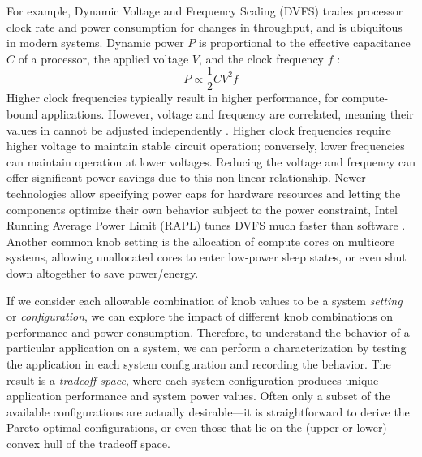 For example, Dynamic Voltage and Frequency Scaling (DVFS) trades processor clock rate and power consumption for changes in throughput, and is ubiquitous in modern systems.
Dynamic power $P$ is proportional to the effective capacitance $C$ of a processor, the applied voltage $V$, and the clock frequency $f$ \cite{Hennessy:2003:CAQ:861856}:
\begin{equation}
P \propto \frac{1}{2}CV^2f
\label{eqn:bg-power}
\end{equation}
Higher clock frequencies typically result in higher performance, \eg for compute-bound applications.
However, voltage and frequency are correlated, meaning their values in  cannot be adjusted independently \cite{LeSueur2010}.
Higher clock frequencies require higher voltage to maintain stable circuit operation; conversely, lower frequencies can maintain operation at lower voltages.
Reducing the voltage and frequency can offer significant power savings due to this non-linear relationship.
Newer technologies allow specifying power caps for hardware resources and letting the components optimize their own behavior subject to the power constraint, \eg Intel Running Average Power Limit (RAPL) tunes DVFS much faster than software \cite{RAPL}.
Another common knob setting is the allocation of compute cores on multicore systems, allowing unallocated cores to enter low-power sleep states, or even shut down altogether to save power/energy.

If we consider each allowable combination of knob values to be a system \emph{setting} or \emph{configuration}, we can explore the impact of different knob combinations on performance and power consumption.
Therefore, to understand the behavior of a particular application on a system, we can perform a characterization by testing the application in each system configuration and recording the behavior.
The result is a \emph{tradeoff space}, where each system configuration produces unique application performance and system power values.
Often only a subset of the available configurations are actually desirable---it is straightforward to derive the Pareto-optimal configurations, or even those that lie on the (upper or lower) convex hull of the tradeoff space.

